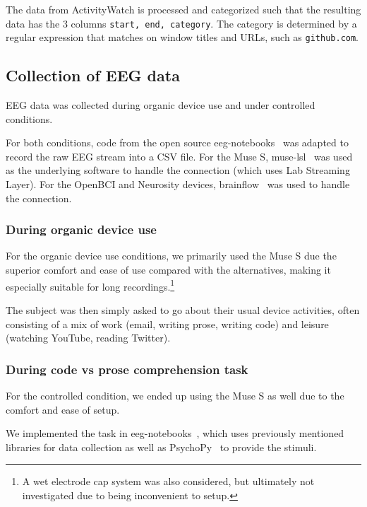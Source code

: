         The data from ActivityWatch is processed and categorized such that the resulting data has the 3 columns \texttt{start, end, category}. The category is determined by a regular expression that matches on window titles and URLs, such as \texttt{github.com}.

    \subsection{Collection of EEG data}

        EEG data was collected during organic device use and under controlled conditions.

        For both conditions, code from the open source eeg-notebooks~\cite{barachant_eeg-notebooks_2020} was adapted to record the raw EEG stream into a CSV file. For the Muse S, muse-lsl~\cite{muse-lsl} was used as the underlying software to handle the connection (which uses Lab Streaming Layer). For the OpenBCI and Neurosity devices, brainflow~\cite{noauthor_brainflow_2020} was used to handle the connection.

        \subsubsection{During organic device use}

            For the organic device use conditions, we primarily used the Muse S due the superior comfort and ease of use compared with the alternatives, making it especially suitable for long recordings.\footnote{A wet electrode cap system was also considered, but ultimately not investigated due to being inconvenient to setup.}

            The subject was then simply asked to go about their usual device activities, often consisting of a mix of work (email, writing prose, writing code) and leisure (watching YouTube, reading Twitter).

        \subsubsection{During code vs prose comprehension task}

            For the controlled condition, we ended up using the Muse S as well due to the comfort and ease of setup.

            We implemented the task in eeg-notebooks~\cite{barachant_eeg-notebooks_2020}, which uses previously mentioned libraries for data collection as well as PsychoPy~\cite{peirce_psychopy2_2019} to provide the stimuli.

